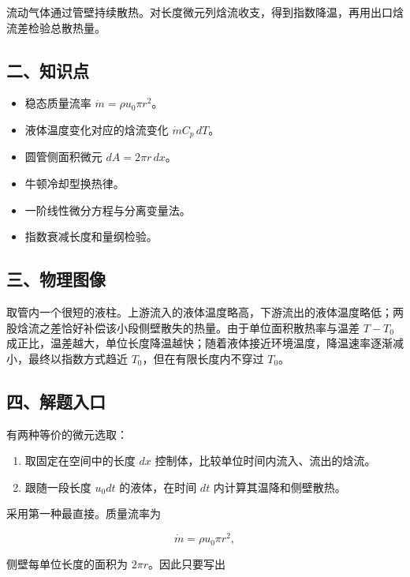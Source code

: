 \documentclass[12pt,a4paper,UTF8]{ctexart}
\newcommand{\tightlist}{\setlength{\itemsep}{0pt}\setlength{\parskip}{0pt}}
\begin{document}
流动气体通过管壁持续散热。对长度微元列焓流收支，得到指数降温，再用出口焓流差检验总散热量。

\subsection{二、知识点}\label{ux4e8cux77e5ux8bc6ux70b9-6}

\begin{itemize}
\tightlist
\item
  稳态质量流率 \(\dot m=\rho u_0\pi r^2\)。
\item
  液体温度变化对应的焓流变化 \(\dot m C_p\,dT\)。
\item
  圆管侧面积微元 \(dA=2\pi r\,dx\)。
\item
  牛顿冷却型换热律。
\item
  一阶线性微分方程与分离变量法。
\item
  指数衰减长度和量纲检验。
\end{itemize}

\subsection{三、物理图像}\label{ux4e09ux7269ux7406ux56feux50cf-6}

取管内一个很短的液柱。上游流入的液体温度略高，下游流出的液体温度略低；两股焓流之差恰好补偿该小段侧壁散失的热量。由于单位面积散热率与温差
\(T-T_0\)
成正比，温差越大，单位长度降温越快；随着液体接近环境温度，降温速率逐渐减小，最终以指数方式趋近
\(T_0\)，但在有限长度内不穿过 \(T_0\)。

\subsection{四、解题入口}\label{ux56dbux89e3ux9898ux5165ux53e3-6}

有两种等价的微元选取：

\begin{enumerate}
\def\labelenumi{\arabic{enumi}.}
\tightlist
\item
  取固定在空间中的长度 \(dx\) 控制体，比较单位时间内流入、流出的焓流。
\item
  跟随一段长度 \(u_0dt\) 的液体，在时间 \(dt\) 内计算其温降和侧壁散热。
\end{enumerate}

采用第一种最直接。质量流率为

\[\dot m=\rho u_0\pi r^2,\]

侧壁每单位长度的面积为 \(2\pi r\)。因此只要写出
\end{document}

